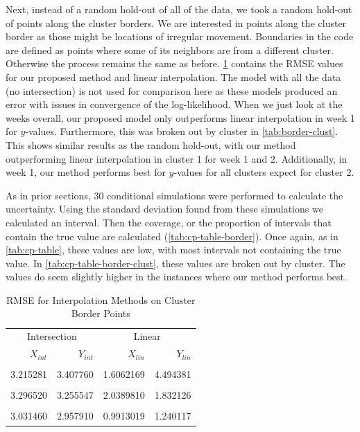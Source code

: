 \documentclass[12pt]{article}
\begin{document}
Next, instead of a random hold-out of all of the data, we took a random
hold-out of points along the cluster borders. We are interested in
points along the cluster border as those might be locations of irregular
movement. Boundaries in the code are defined as points where some of its
neighbors are from a different cluster. Otherwise the process remains
the same as before. \cref{tab:border-cv-rmse} contains the RMSE values
for our proposed method and linear interpolation. The model with all the
data (no intersection) is not used for comparison here as these models
produced an error with issues in convergence of the log-likelihood. When
we just look at the weeks overall, our proposed model only outperforms
linear interpolation in week 1 for \(y\)-values. Furthermore, this was
broken out by cluster in \cref{tab:border-clust}. This shows similar
results as the random hold-out, with our method outperforming linear
interpolation in cluster 1 for week 1 and 2. Additionally, in week 1,
our method performs best for \(y\)-values for all clusters expect for
cluster 2.

As in prior sections, 30 conditional simulations were performed to
calculate the uncertainty. Using the standard deviation found from these
simulations we calculated an interval. Then the coverage, or the
proportion of intervals that contain the true value are calculated
(\cref{tab:cp-table-border}). Once again, as in \cref{tab:cp-table},
these values are low, with most intervals not containing the true value.
In \cref{tab:cp-table-border-clust}, these values are broken out by
cluster. The values do seem slightly higher in the instances where our
method performs best.

\begin{table}

\caption{\label{tab:border-cv-rmse}RMSE for Interpolation Methods on Cluster Border Points}
\centering
\begin{tabular}[t]{rrrr}
\toprule
\multicolumn{2}{c}{Intersection} & \multicolumn{2}{c}{Linear} \\
\cmidrule(l{3pt}r{3pt}){1-2} \cmidrule(l{3pt}r{3pt}){3-4}
$X_{int}$ & $Y_{int}$ & $X_{lin}$ & $Y_{lin}$\\
\midrule
\addlinespace[0.3em]
\multicolumn{4}{l}{\textbf{Week 1}}\\
\hspace{1em}3.215281 & 3.407760 & 1.6062169 & 4.494381\\
\addlinespace[0.3em]
\multicolumn{4}{l}{\textbf{Week 2}}\\
\hspace{1em}3.296520 & 3.255547 & 2.0389810 & 1.832126\\
\addlinespace[0.3em]
\multicolumn{4}{l}{\textbf{Week 3}}\\
\hspace{1em}3.031460 & 2.957910 & 0.9913019 & 1.240117\\
\bottomrule
\end{tabular}
\end{table}
\end{document}
